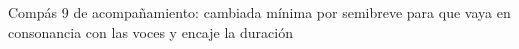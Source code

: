 Compás 9 de acompañamiento: cambiada mínima por semibreve para que vaya en consonancia con las voces y encaje la duración


